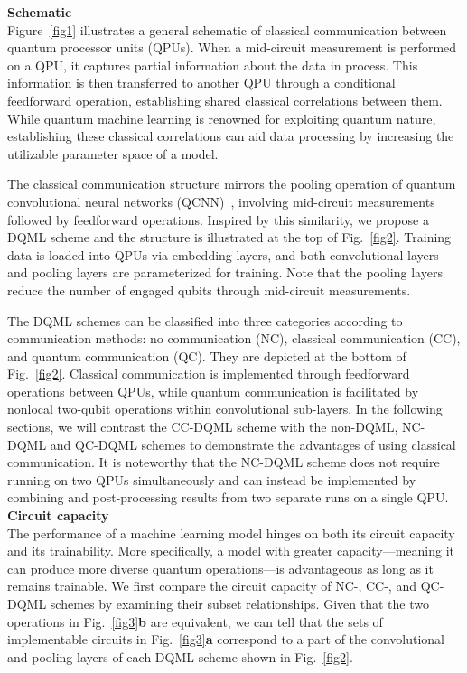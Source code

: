 \documentclass[aps,prx,reprint,amsmath,amssymb,superscriptaddress,nobibnotes,showpacs]{revtex4-2}
\begin{document}
\noindent\textbf{Schematic}\\
Figure~\ref{fig1} illustrates a general schematic of classical communication between quantum processor units (QPUs).
When a mid-circuit measurement is performed on a QPU, it captures partial information about the data in process.
This information is then transferred to another QPU through a conditional feedforward operation, establishing shared classical correlations between them. While quantum machine learning is renowned for exploiting quantum nature, establishing these classical correlations can aid data processing by increasing the utilizable parameter space of a model. 

The classical communication structure mirrors the pooling operation of quantum convolutional neural networks (QCNN)~\cite{cong2019quantum}, involving mid-circuit measurements followed by feedforward operations. Inspired by this similarity, we propose a DQML scheme and the structure is illustrated at the top of Fig.~\ref{fig2}. Training data is loaded into QPUs via embedding layers, and both convolutional layers and pooling layers are parameterized for training. Note that the pooling layers reduce the number of engaged qubits through mid-circuit measurements. 

The DQML schemes can be classified into three categories according to communication methods: no communication (NC), classical communication (CC), and quantum communication (QC). They are depicted at the bottom of Fig.~\ref{fig2}. Classical communication is implemented through feedforward operations
between QPUs, while quantum communication is facilitated by nonlocal two-qubit operations within convolutional sub-layers. In the following sections, we will contrast the CC-DQML scheme with the non-DQML, NC-DQML and QC-DQML schemes to demonstrate the advantages of using classical communication. It is noteworthy that the NC-DQML scheme does not require running on two QPUs simultaneously and can instead be implemented by
combining and post-processing results from two separate runs on a single QPU. \\


\noindent\textbf{Circuit capacity}\\
The performance of a machine learning model hinges on both its circuit capacity and its trainability. More specifically, a model with greater capacity---meaning it can produce more diverse quantum operations---is advantageous as long as it remains trainable. We first compare the circuit capacity of NC-, CC-, and QC-DQML schemes by examining their subset relationships. Given that the two operations in Fig.~\ref{fig3}\textbf{b} are equivalent, we can tell that the sets of implementable circuits in Fig.~\ref{fig3}\textbf{a} correspond to a part of the convolutional and pooling layers of each DQML scheme shown in Fig.~\ref{fig2}. 
\end{document}
